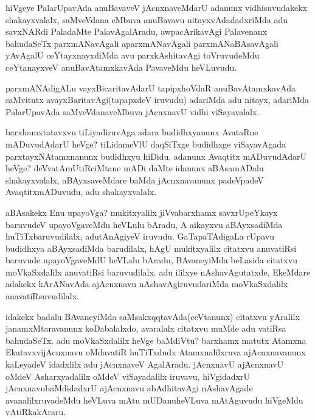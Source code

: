 \begin{artha}

hiVgeye PalarUpavAda anuBavaveV jAcnxnaveMdarU adanunx vidhisuvudakekx
shakayxvalalx, saMveVdana eMbuva anuBavavu nitayxvAdadadxriMda adu
savxNARdi PaladaMte PalavAgalAradu, awpacArikavAgi Palavenanx
bahudaSeTx parxmANavAgali aparxmANavAgali parxmANaBAsavAgali yAvAgalU
ceYtayxnayxdiMda avu parxkAshitavAgi toVruvudeMdu ceYtanayxveV
anuBavAtamxkavAda PavaveMdu heVLuvudu.

parxmANAdigALu vayxBicaritavAdarU tapipxhoVdaR anuBavAtamxkavAda
saMvitutx avayxBaritavAgi(tapapxdeV iruvudu) adariMda adu nitayx,
adariMda PalarUpavAda saMveVdanaveMbuva jAcnxnavU vidhi viSayavalalx.
\end{artha}

\begin{center}


\end{center}

\begin{artha}
barxhamxtatavxvu tiLiyadiruvAga adara budidhxyanunx AvataRne
mADuvudAdarU heVge? tiLidameVlU daqSiTxge budidhxge viSayavAgada
parxtayxNAtamxnanunx budidhxyu hiDidu. adanunx Avaqtitx mADuvudAdarU
heVge? deVvatAmUtiRciMtane mADi daMte idanunx aBAsamADalu
shakayxvalalx, aBAyxsaveMdare baMda jAcnxnavanunx padeVpadeV
AvaqtitxmADuvudu, adu shakayxvalalx.
\end{artha}

\begin{center}


\end{center}

\begin{artha}
aBAsakekx Enu upayoVga? mukitxyalilx jiVvabarxhamx savxrUpeYkayx
baruvudeV upayoVgaveMdu heVLulu bAradu, A aikayxvu aBAyxsadiMda
huTiTxbaruvudilalx, adutAnAgiyeV iruvudu. GaTapaTAdigaLa rUpavu
budidhxya aBAyxsadiMda barudilalx, hAgU mukitxyalilx citatxvu
anuvatiRsi baruvude upayoVgaveMdU heVLalu bAradu, BAvaneyiMda beLasida
citatxvu moVkaSxdalilx anuvatiRsi baruvudilalx. adu ililxye
nAshavAgutatxde, EkeMdare adakekx kArANavAda ajAcnxnavu
nAshavAgiruvudariMda moVkaSxdalilx anavatiRsuvudilalx.

idakekx badalu BAvaneyiMda saMsakxqqtavAda(ceVtanunx) citatxvu
yAralilx janamxMtaravanunx koDabalalxdo, avaralalx citatxvu muMde adu
vatiRsa bahudaSeTx. adu moVkaSxdalilx heVge baMdiVtu? barxhamx matutx
Atamxna EkatavxvijAcnxnavu oMdavatiR huTiTxdudx Atamxnalilxruva
ajAcnxnavanunx kaLeyadeV idadxlilx adu jAcnxnaveV
AgalAradu. jAcnxnavU ajAcnxnavU oMdeV Asharxyadalilx oMdeV
viSayadalilx iruvavu, hiVgidadxrU jAcnxnavubaMdidadxrU ajAcnxnavu
abAdhitavAgi nAshavAgade avanalilxruvadeMdu heVLuva mAtu mUDanuheVLuva
mAtAguvudu hiVgeMdu vAtiRkakAraru.
\end{artha}


